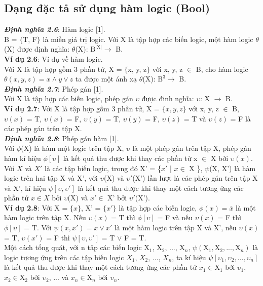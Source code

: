 \documentclass[a4paper,13pt,oneside,openany]{book}
\begin{document}
\begin{flushleft}
		\section{Dạng đặc tả sử dụng hàm logic (Bool)}
		\textbf{\textit{Định nghĩa 2.6}}: Hàm logic [1].\\
		B = $\{$T, F$\}$ là miền giá trị logic. Với X là tập hợp các biến logic, một hàm logic $\theta$(X) được định nghĩa: $\theta$(X): $\textrm{B}^\textrm{{|X|}} \rightarrow$ B.\\
		\textbf{Ví dụ 2.6}: Ví dụ về hàm logic.\\
		Với X là tập hợp gồm 3 phần tử, X = $\{$x, y, z$\}$ với x, y, z $\in$ B, cho hàm logic $\theta(x, y, z) = x \land y \lor z$ ta được một ánh xạ $\theta$(X): $\textrm{B}^3 \rightarrow$ B.\\
		\textbf{\textit{Định nghĩa 2.7}}: Phép gán [1].\\
		Với X là tập hợp các biến logic, phép gán $\upsilon$ được đinh nghĩa: $\upsilon$: X $\rightarrow$ B.\\
		\textbf{Ví dụ 2.7}: Với X là tập hợp gồm 3 phần tử, X = $\{x, y, z\}$ với x, y, z $\in$ B, $\upsilon(x)$ = T, $\upsilon(x)$ = F, $\upsilon(y)$ = T, $\upsilon(y)$ = F, $\upsilon(z)$ = T và $\upsilon(z)$ = F là các phép gán trên tập X.\\
		\textbf{\textit{Định nghĩa 2.8}}: Phép gán hàm [1].\\
		Với $\phi$(X) là hàm một logic trên tập X, $\upsilon$ là một phép gán trên tập X, phép gán hàm kí hiệu $\phi[\upsilon]$ là kết quả thu được khi thay các phần tử x $\in$ X bởi $\upsilon(x)$.
		Với $X$ và $X'$ là các tập biến logic, trong đó X' = \{$x'$ | $x \in$ X \}, $\psi$(X, X') là hàm logic trên hai tập X và X', với $\upsilon$(X) và $\upsilon'$(X') lần lượt là các phép gán trên tập X và X', kí hiệu $\psi[\upsilon, \upsilon']$ là kết quả thu được khi thay một cách tương ứng các phần tử $x \in X$ bởi $\upsilon$(X) và $x' \in$ X' bởi $\upsilon'$(X').\\
		\textbf{Ví dụ 2.8}: Với X = $\{x\}$, X' = $\{x'\}$ là tập hợp các biến logic, $\phi(x) = \overline{x}$ là một hàm logic trên tập X. Nếu $\upsilon(x)$ = T thì $\phi[\upsilon]$ = F và nếu $\upsilon(x)$ = F thì $\phi[\upsilon]$ = T. Với $\psi(x, x') = x \lor x'$ là một hàm logic trên tập X và X', nếu $\upsilon(x)$ = T, $\upsilon(x')$ = F thì $\psi[\upsilon, \upsilon']$ = T $\lor$ F = T.\\
		Một cách tổng quát, với n tâp các biến logic $\textrm{X}_1$, $\textrm{X}_2$, ..., $\textrm{X}_n$, $\psi(\textrm{X}_1, \textrm{X}_2, ..., \textrm{X}_n)$ là logic tương ứng trên các tập biến logic $X_1$, $X_2$, ..., $X_n$, ta kí hiệu $\psi[\upsilon_1, \upsilon_2, ..., \upsilon_n]$ là kết quả thu được khi thay một cách tương ứng các phần tử $x_1 \in \textrm{X}_1$ bởi $\upsilon_1$, $x_2 \in \textrm{X}_2$ bởi $\upsilon_2$, ... và $x_n \in \textrm{X}_n$ bởi $\upsilon_n$.\\

\end{flushleft}
\end{document}
